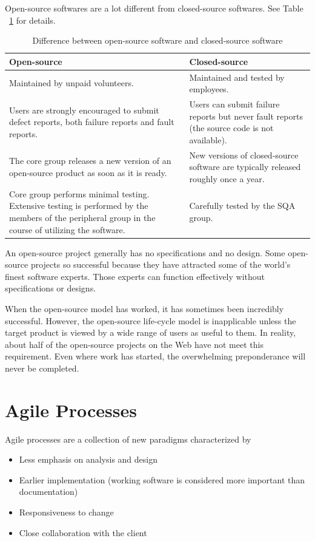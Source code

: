 \documentclass[11pt]{article}
\begin{document}
Open-source softwares are a lot different from closed-source softwares. See Table ~\ref{tab:OpenSourceDiff} for details.
\begin{table}  
\caption{Difference between open-source software and closed-source software}  
\label{tab:OpenSourceDiff}
\begin{center}  
\begin{tabular}{p{5cm}|p{5cm}}  
\hline  
Open-source & Closed-source \\ \hline 
Maintained by unpaid volunteers. & Maintained and tested by employees.  \\ \hline  
Users are strongly encouraged to submit defect reports, both failure reports and fault reports. 
& Users can submit failure reports but never fault reports (the source code is not available).\\ \hline  
The core group releases a new version of an open-source product as soon as it is ready.
& New versions of closed-source software are typically released roughly once a year. \\ \hline  
Core group performs minimal testing. Extensive testing is performed by the members of the
peripheral group in the course of utilizing the software.
& Carefully tested by the SQA group. \\ \hline  
\end{tabular}  
\end{center} 
\end{table} 

An open-source project generally has no specifications and no design. Some open-source projects so successful because they have attracted some of the world’s finest software experts. Those experts can function effectively without specifications or designs.

When the open-source model has worked, it has sometimes been incredibly successful. However, the open-source life-cycle model is inapplicable unless the target product is viewed by a wide range of users as useful to them. In reality, about half of the open-source projects on the Web have not meet this requirement. Even where work has started, the overwhelming preponderance will never be completed.

\newpage
\section*{Agile Processes}

Agile processes are a collection of new paradigms characterized by
\begin{itemize}
	\item Less emphasis on analysis and design
	\item Earlier implementation (working software is considered more important than documentation)
	\item Responsiveness to change
	\item Close collaboration with the client
\end{itemize}
\end{document}
